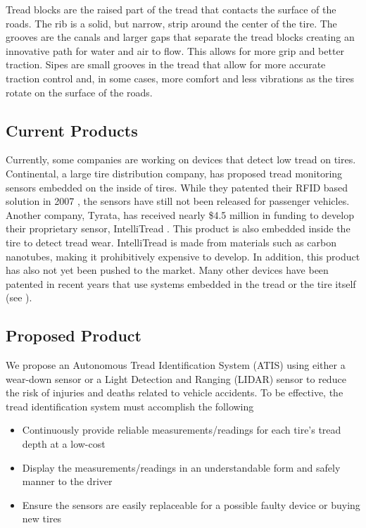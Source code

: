 \documentclass[11pt]{IEEEtran}
\begin{document}
			Tread blocks are the raised part of the tread that contacts the surface of the roads. The rib is a solid, but narrow, strip around the center of the tire. The grooves are the canals and larger gaps that separate the tread blocks creating an innovative path for water and air to flow. This allows for more grip and better traction. Sipes are small grooves in the tread that allow for more accurate traction control and, in some cases, more comfort and less vibrations as the tires rotate on the surface of the roads. 

		\subsection{Current Products}
			Currently, some companies are working on devices that detect low tread on tires. Continental, a large tire distribution company, has proposed tread monitoring sensors embedded on the inside of tires. While they patented their RFID based solution in 2007 \cite{continentalPatent}, the sensors have still not been released for passenger vehicles. Another company, Tyrata, has received nearly \$4.5 million in funding to develop their proprietary sensor, IntelliTread \cite{intellitread}. This product is also embedded inside the tire to detect tread wear. IntelliTread is made from materials such as carbon nanotubes, making it prohibitively expensive to develop. In addition, this product has also not yet been pushed to the market. Many other devices have been patented in recent years that use systems embedded in the tread or the tire itself (see \cite{goodyearPatent1, nxpbvPatent, goodyearPatent2, patent4}).

		\subsection{Proposed Product}
			We propose an Autonomous Tread Identification System (ATIS) using either a wear-down sensor or a Light Detection and Ranging (LIDAR) sensor to reduce the risk of injuries and deaths related to vehicle accidents. To be effective, the tread identification system must accomplish the following

			\begin{itemize}
				\item Continuously provide reliable measurements/readings for each tire’s tread depth at a low-cost
				\item Display the measurements/readings in an understandable form and safely manner to the driver
				\item Ensure the sensors are easily replaceable for a possible faulty device or buying new tires 
			\end{itemize}
\end{document}
